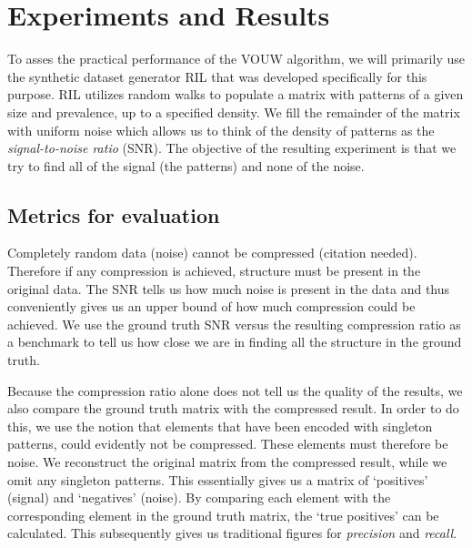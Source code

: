 \documentclass{llncs}
\begin{document}
\section{Experiments and Results}

To asses the practical performance of the VOUW algorithm, we will primarily use the synthetic dataset generator RIL that was developed specifically for this purpose. RIL utilizes random walks to populate a matrix with patterns of a given size and prevalence, up to a specified density. We fill the remainder of the matrix with uniform noise which allows us to think of the density of patterns as the \emph{signal-to-noise ratio} (SNR). The objective of the resulting experiment is that we try to find all of the signal (the patterns) and none of the noise.

\subsection{Metrics for evaluation}

Completely random data (noise) cannot be compressed (citation needed). Therefore if any compression is achieved, structure must be present in the original data. The SNR tells us how much noise is present in the data and thus conveniently gives us an upper bound of how much compression could be achieved. We use the ground truth SNR versus the resulting compression ratio as a benchmark to tell us how close we are in finding all the structure in the ground truth.

Because the compression ratio alone does not tell us the quality of the results, we also compare the ground truth matrix with the compressed result. In order to do this, we use the notion that elements that have been encoded with singleton patterns, could evidently not be compressed. These elements must therefore be noise. We reconstruct the original matrix from the compressed result, while we omit any singleton patterns. This essentially gives us a matrix of `positives' (signal) and `negatives' (noise). By comparing each element with the corresponding element in the ground truth matrix, the `true positives' can be calculated. This subsequently gives us traditional  figures for \emph{precision} and \emph{recall}.
\end{document}

